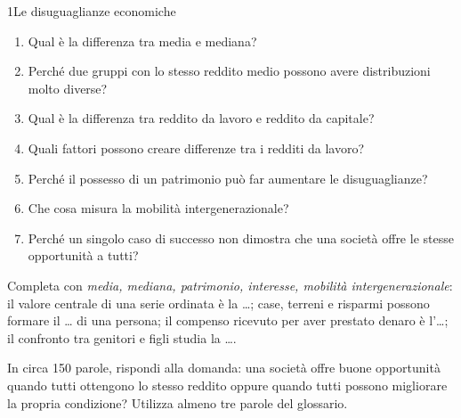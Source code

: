 \begin{lettura}{1}{Le disuguaglianze economiche}
\attivita
\begin{enumerate}
\item Qual è la differenza tra media e mediana?
\item Perché due gruppi con lo stesso reddito medio possono avere distribuzioni molto diverse?
\item Qual è la differenza tra reddito da lavoro e reddito da capitale?
\item Quali fattori possono creare differenze tra i redditi da lavoro?
\item Perché il possesso di un patrimonio può far aumentare le disuguaglianze?
\item Che cosa misura la mobilità intergenerazionale?
\item Perché un singolo caso di successo non dimostra che una società offre le stesse opportunità a tutti?
\end{enumerate}

\lessico
{}

\lingua
Completa con \emph{media, mediana, patrimonio, interesse, mobilità intergenerazionale}: il valore centrale di una serie ordinata è la \ldots; case, terreni e risparmi possono formare il \ldots{} di una persona; il compenso ricevuto per aver prestato denaro è l'\ldots; il confronto tra genitori e figli studia la \ldots.

\scrittura
In circa 150 parole, rispondi alla domanda: una società offre buone opportunità quando tutti ottengono lo stesso reddito oppure quando tutti possono migliorare la propria condizione? Utilizza almeno tre parole del glossario.

\end{lettura}



